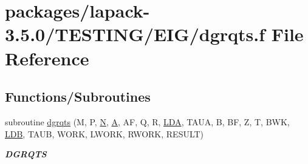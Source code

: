 \hypertarget{dgrqts_8f}{}\section{packages/lapack-\/3.5.0/\+T\+E\+S\+T\+I\+N\+G/\+E\+I\+G/dgrqts.f File Reference}
\label{dgrqts_8f}
\subsection*{Functions/\+Subroutines}
\begin{DoxyCompactItemize}
\item 
subroutine \hyperlink{group__double__eig_ga7407f6eaf402bcb6bbda3e5bd46485fa}{dgrqts} (M, P, \hyperlink{polmisc_8c_a0240ac851181b84ac374872dc5434ee4}{N}, \hyperlink{classA}{A}, A\+F, Q, R, \hyperlink{example__user_8c_ae946da542ce0db94dced19b2ecefd1aa}{L\+D\+A}, T\+A\+U\+A, B, B\+F, Z, T, B\+W\+K, \hyperlink{example__user_8c_a50e90a7104df172b5a89a06c47fcca04}{L\+D\+B}, T\+A\+U\+B, W\+O\+R\+K, L\+W\+O\+R\+K, R\+W\+O\+R\+K, R\+E\+S\+U\+L\+T)
\begin{DoxyCompactList}\small\item\em {\bfseries D\+G\+R\+Q\+T\+S} \end{DoxyCompactList}\end{DoxyCompactItemize}
